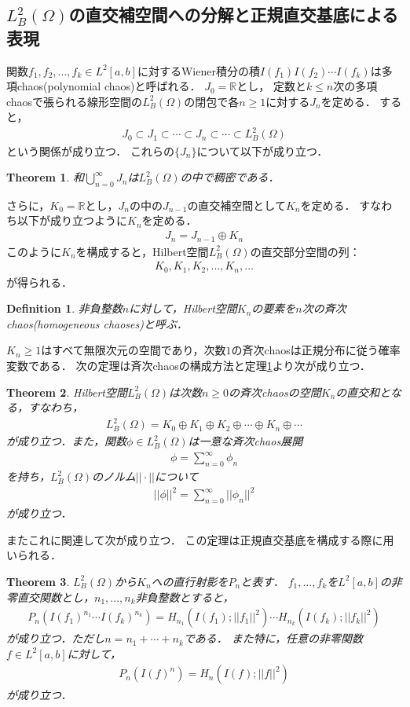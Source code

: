 \documentclass[a4paper,10pt]{jsarticle}
\theoremstyle{plain}
\newtheorem{theorem}{Theorem}
\newtheorem{definition}{Definition}
\newcommand{\eq}[1]{\begin{align}#1\end{align}}
\begin{document}
\subsection{$L^2_B(\Omega)$の直交補空間への分解と正規直交基底による表現}
関数$f_1,f_2,...,f_k\in L^2[a,b]$に対するWiener積分の積$I(f_1)I(f_2)\cdots I(f_k)$は多項chaos(polynomial chaos)と呼ばれる．
$J_0=\mathbb{R}$とし，
定数と$k\le n$次の多項chaosで張られる線形空間の$L^2_B(\Omega)$の閉包で各$n\ge 1$に対する$J_n$を定める．
すると，
\eq{J_0\subset J_1\subset\cdots\subset J_n\subset\cdots\subset L^2_B(\Omega)\label{9.4.5}}
という関係が成り立つ．
これらの$\{J_n\}$について以下が成り立つ．
\begin{theorem}\label{thm9.4.5}%
和$\bigcup_{n=0}^\infty J_n$は$L^2_B(\Omega)$の中で稠密である．
\end{theorem}

さらに，$K_0=\mathbb{R}$とし，$J_n$の中の$J_{n-1}$の直交補空間として$K_n$を定める．
すなわち以下が成り立つように$K_n$を定める．
\eq{J_n=J_{n-1}\oplus K_n}
このように$K_n$を構成すると，Hilbert空間$L^2_B(\Omega)$の直交部分空間の列：
\eq{K_0,K_1,K_2,...,K_n,...}
が得られる．
\begin{definition}
非負整数$n$に対して，Hilbert空間$K_n$の要素を$n$次の斉次chaos(homogeneous chaoses)と呼ぶ．
\end{definition}
$K_n\ge 1$はすべて無限次元の空間であり，次数$1$の斉次chaosは正規分布に従う確率変数である．
次の定理は斉次chaosの構成方法と定理\ref{thm9.4.5}より次が成り立つ．
\begin{theorem}\label{thm9.4.7}%
Hilbert空間$L^2_B(\Omega)$は次数$n\ge0$の斉次chaosの空間$K_n$の直交和となる，すなわち，
\eq{L^2_B(\Omega)=K_0\oplus K_1\oplus K_2\oplus\cdots\oplus K_n\oplus\cdots}
が成り立つ．また，関数$\phi\in L^2_B(\Omega)$は一意な斉次chaos展開
\eq{\phi=\sum_{n=0}^\infty\phi_n}
を持ち，$L^2_B(\Omega)$のノルム$||\cdot||$について
\eq{||\phi||^2=\sum_{n=0}^\infty||\phi_n||^2}
が成り立つ．
\end{theorem}
またこれに関連して次が成り立つ．
この定理は正規直交基底を構成する際に用いられる．
\begin{theorem}\label{thm9.4.9}%
$L^2_B(\Omega)$から$K_n$への直行射影を$P_n$と表す．
$f_1,...,f_k$を$L^2[a,b]$の非零直交関数とし，$n_1,...,n_k$非負整数とすると，
\eq{P_n(I(f_1)^{n_1}\cdots I(f_k)^{n_k})=H_{n_1}(I(f_1);||f_1||^2)\cdots H_{n_k}(I(f_k);||f_k||^2)}
が成り立つ．ただし$n=n_1+\cdots+n_k$である．
また特に，任意の非零関数$f\in L^2[a,b]$に対して，
\eq{P_n(I(f)^n)=H_n(I(f);||f||^2)}
が成り立つ．
\end{theorem}
\end{document}

